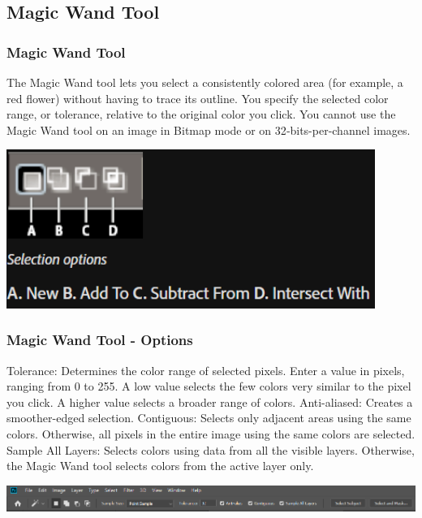 \documentclass{beamer}
\begin{document}
	
\subsection{Magic Wand Tool}
\begin{frame}
	\frametitle{Magic Wand Tool}
	\begin{outline}
		\1 The Magic Wand tool lets you select a consistently colored area (for example, a red flower) without having to trace its outline. 
		\1 You specify the selected color range, or tolerance, relative to the original color you click.
		\1 You cannot use the Magic Wand tool on an image in Bitmap mode or on 32‑bits-per-channel images.
	\end{outline}
	\begin{center}
		\includegraphics[width = 0.9\textwidth]{images/magic wand1.png}
	\end{center}
\end{frame}

\begin{frame}
	\frametitle{Magic Wand Tool - Options}
	\begin{outline}
		\1 Tolerance: 
		\2 Determines the color range of selected pixels. Enter a value in pixels, ranging from 0 to 255. A low value selects the few colors very similar to the pixel you click. A higher value selects a broader range of colors.
		\1 Anti-aliased: 
		\2 Creates a smoother-edged selection.
		\1 Contiguous: 
		\2 Selects only adjacent areas using the same colors. Otherwise, all pixels in the entire image using the same colors are selected.
		\1 Sample All Layers: 
		\2 Selects colors using data from all the visible layers. Otherwise, the Magic Wand tool selects colors from the active layer only.
	\end{outline}
	\begin{center}
		\includegraphics[width = 1.1\textwidth]{images/magic wand2.png}
	\end{center}
\end{frame}
\end{document}
